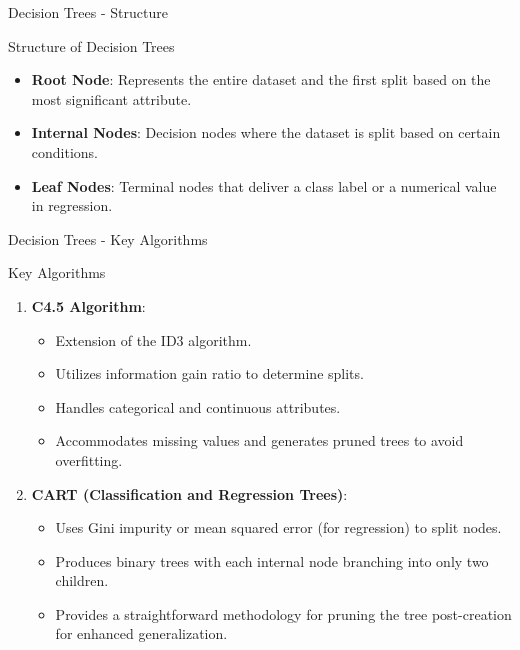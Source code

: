 \documentclass[aspectratio=169]{beamer}
\begin{document}
\begin{frame}[fragile]{Decision Trees - Structure}
    \begin{block}{Structure of Decision Trees}
        \begin{itemize}
            \item \textbf{Root Node}: Represents the entire dataset and the first split based on the most significant attribute.
            \item \textbf{Internal Nodes}: Decision nodes where the dataset is split based on certain conditions.
            \item \textbf{Leaf Nodes}: Terminal nodes that deliver a class label or a numerical value in regression.
        \end{itemize}
    \end{block}
\end{frame}

\begin{frame}[fragile]{Decision Trees - Key Algorithms}
    \begin{block}{Key Algorithms}
        \begin{enumerate}
            \item \textbf{C4.5 Algorithm}:
            \begin{itemize}
                \item Extension of the ID3 algorithm.
                \item Utilizes information gain ratio to determine splits.
                \item Handles categorical and continuous attributes.
                \item Accommodates missing values and generates pruned trees to avoid overfitting.
            \end{itemize}
            
            \item \textbf{CART (Classification and Regression Trees)}:
            \begin{itemize}
                \item Uses Gini impurity or mean squared error (for regression) to split nodes.
                \item Produces binary trees with each internal node branching into only two children.
                \item Provides a straightforward methodology for pruning the tree post-creation for enhanced generalization.
            \end{itemize}
        \end{enumerate}
    \end{block}
\end{frame}
\end{document}

